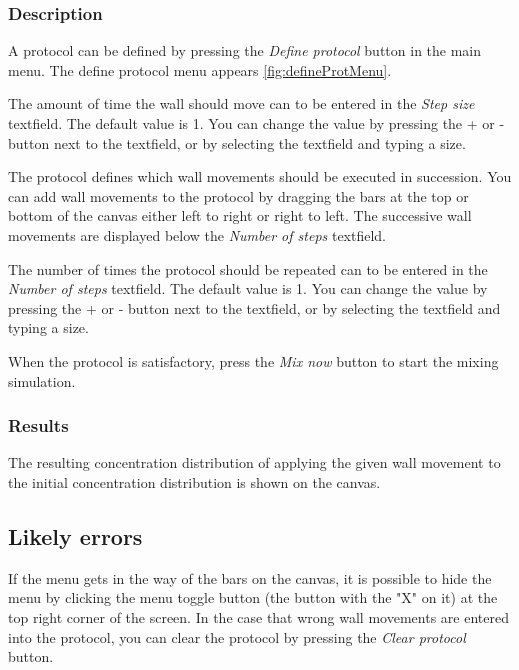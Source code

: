 \subsubsection{Description}
A protocol can be defined by pressing the \emph{Define protocol} button in the main menu. The define protocol menu appears \ref{fig:defineProtMenu}.


The amount of time the wall should move can to be entered in the \emph{Step size} textfield. The default value is 1. You can change the value by pressing the + or - button next to the textfield, or by selecting the textfield and typing a size.

The protocol defines which wall movements should be executed in succession. You can add wall movements to the protocol by dragging the bars at the top or bottom of the canvas either left to right or right to left. The successive wall movements are displayed below the \emph{Number of steps} textfield.

The number of times the protocol should be repeated can to be entered in the \emph{Number of steps} textfield. The default value is 1. You can change the value by pressing the + or - button next to the textfield, or by selecting the textfield and typing a size.

When the protocol is satisfactory, press the \emph{Mix now} button to start the mixing simulation.

\subsubsection{Results}
The resulting concentration distribution of applying the given wall movement to the initial concentration distribution is shown on the canvas.

\subsection{Likely errors}
If the menu gets in the way of the bars on the canvas, it is possible to hide the menu by clicking the menu toggle button (the button with the "X" on it) at the top right corner of the screen. In the case that wrong wall movements are entered into the protocol, you can clear the protocol by pressing the \emph{Clear protocol} button.


